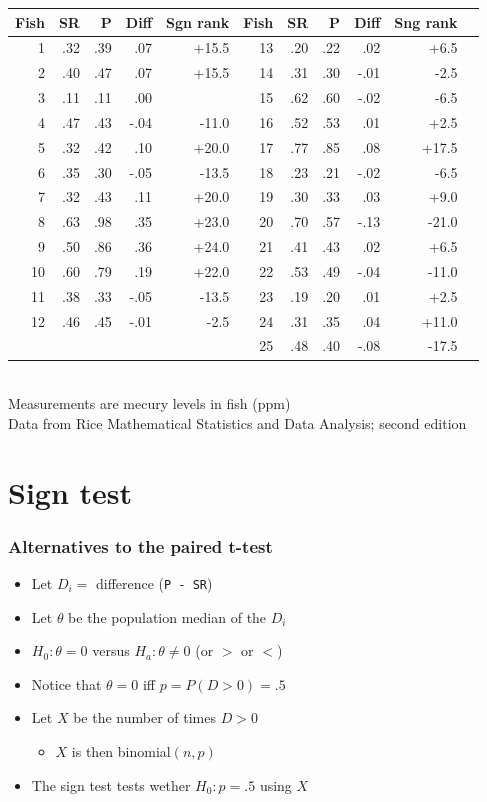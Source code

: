 \documentclass[aspectratio=169]{beamer}
\begin{document}
\begin{frame}
 \ttfamily \scriptsize
  \begin{tabular}{rrrrrrrrrrr}
Fish & SR  & P   & Diff & Sgn rank   & Fish & SR  & P   & Diff & Sng rank   \\ \hline
1    & .32 & .39 & .07  & +15.5  & 13   & .20 & .22 & .02  & +6.5   \\
2    & .40 & .47 & .07  & +15.5  & 14   & .31 & .30 & -.01 & -2.5   \\
3    & .11 & .11 & .00  &        & 15   & .62 & .60 & -.02 & -6.5   \\
4    & .47 & .43 & -.04 & -11.0  & 16   & .52 & .53 &  .01 & +2.5   \\
5    & .32 & .42 & .10  & +20.0  & 17   & .77 & .85 & .08  & +17.5  \\
6    & .35 & .30 & -.05 & -13.5  & 18   & .23 & .21 & -.02 & -6.5   \\
7    & .32 & .43 & .11  & +20.0  & 19   & .30 & .33 & .03  & +9.0   \\
8    & .63 & .98 & .35  & +23.0  & 20   & .70 & .57 & -.13 & -21.0  \\
9    & .50 & .86 & .36  & +24.0  & 21   & .41 & .43 &  .02 & +6.5   \\
10   & .60 & .79 & .19  & +22.0  & 22   & .53 & .49 & -.04 & -11.0  \\
11   & .38 & .33 & -.05 & -13.5  & 23   & .19 & .20 &  .01 & +2.5   \\
12   & .46 & .45 & -.01 & -2.5   & 24   & .31 & .35 & .04  & +11.0  \\
     &     &     &      &        & 25   & .48 & .40 & -.08 & -17.5  \\ \hline  
\end{tabular}\\
Measurements are mecury levels in fish (ppm)\\
Data from Rice Mathematical Statistics and Data Analysis; second edition
\normalfont \normalsize
\end{frame}

\section{Sign test}
\begin{frame}\frametitle{Alternatives to the paired t-test}
\begin{itemize}
\item Let $D_i = $ difference (\texttt{P - SR})
\item Let $\theta$ be the population median of the $D_i$
\item $H_0:\theta = 0$ versus $H_a:\theta \neq 0$ (or $>$ or $<$)
\item Notice that $\theta = 0$ iff $p = P(D > 0) = .5$ 
\item Let $X$ be the number of times $D > 0$
  \begin{itemize}
  \item $X$ is then binomial$(n,p)$
  \end{itemize}
\item The sign test tests wether $H_0:p = .5$ using $X$
\end{itemize}
\end{frame} 
\end{document}
